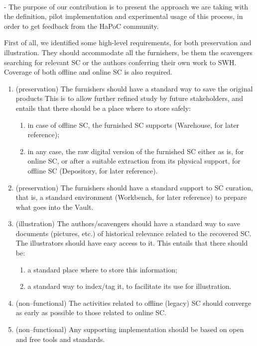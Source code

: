 \documentclass[a4paper]{article}
\begin{document}
\

 - The purpose of our contribution is to present the approach we are taking with the definition, pilot implementation and experimental usage of this process, in order to get feedback from the HaPoC community. 

First of all, we identified some high-level requirements, for both preservation and illustration. They should accommodate all the furnishers, be them the scavengers searching for relevant SC or the authors conferring their own work to SWH. Coverage of both offline and online SC is also required. 
\begin{enumerate}
	\item (preservation) The furnishers should have a standard way to save the original products This is to allow further refined study by future stakeholders, and entails that there should be a place where to store safely:
	\begin{enumerate}
		\item in case of offline SC, the furnished SC supports (Warehouse, for later reference);
		\item in any case, the raw digital version of the furnished SC either as is, for online SC, or after a suitable extraction from its physical support, for offline SC (Depository, for later reference).
	\end{enumerate}
	\item (preservation) The furnishers should have a standard support to SC curation, that is, a standard environment (Workbench, for later reference) to prepare what goes into the  Vault. 
	\item (illustration) The authors/scavengers  should have a standard way to save documents (pictures, etc.) of historical relevance related to the recovered SC. The illustrators should have easy access to it. This entails that there should be:
	\begin{enumerate}
		\item a standard place where to store this information;
		\item a standard way to index/tag it, to facilitate its use for illustration.
		\end{enumerate}
	\item (non--functional) The activities related to offline (legacy) SC should converge as early as possible to those related to online SC.
	\item (non--functional) Any supporting implementation should be based on open and free tools and standards. 
	
\end{enumerate}
\end{document}
